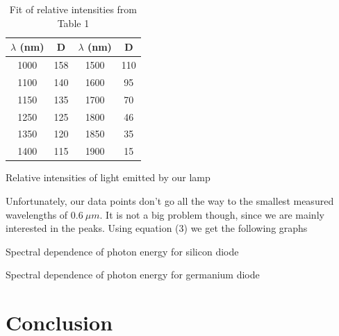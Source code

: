 \documentclass[a4paper,11pt]{article}
\begin{document}
\begin{table}[htpb]
    \begin{minipage}[b]{.45\linewidth}
        \centering
        \begin{tabular}{c c c c}
            $ \lambda $ (nm) & D & $ \lambda $ (nm) & D \\ 
            \hline\hline
            1000 & 158 & 1500 & 110 \\
            1100 & 140 & 1600 & 95 \\
            1150 & 135 & 1700 & 70 \\
            1250 & 125 & 1800 & 46 \\
            1350 & 120 & 1850 & 35 \\
            1400 & 115 & 1900 & 15 \\
        \end{tabular}
        \caption{Relative intensities of light emitted by our lamp}

    \end{minipage} 
    \hfill
    \begin{minipage}[b]{.49\linewidth}
        \centering
        \resizebox{\textwidth}{!}{  }
        \captionsetup{type=graph}
        \caption{Fit of relative intensities from Table 1}
    \end{minipage} 
\end{table}

Unfortunately, our data points don't go all the way to the smallest measured wavelengths of $ 0.6 \ \mu m $. It is not a big problem though, since we are mainly interested in the peaks. Using equation (3) we get the following graphs

\begin{table}[htpb]
    \begin{minipage}[b]{.45\linewidth}
        \centering
        \resizebox{\textwidth}{!}{  }
        \captionsetup{type=graph}
        \caption{Spectral dependence of photon energy for silicon diode }
    \end{minipage} 
    \hfill
    \begin{minipage}[b]{.45\linewidth}
        \centering
        \resizebox{\textwidth}{!}{  }
        \captionsetup{type=graph}
        \caption{Spectral dependence of photon energy for germanium diode }
    \end{minipage} 
\end{table}

\section{Conclusion}
\end{document}
